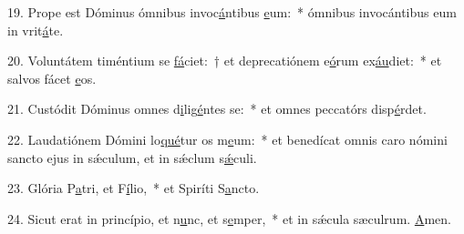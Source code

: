 19. Prope est Dóminus ómnibus invoc\uline{á}ntibus \uline{e}um:~* ómnibus invocántibus eum in vrit\uline{á}te.\par 
20. Voluntátem timéntium se \uline{fá}ciet:~† et deprecatiónem e\uline{ó}rum ex\uline{áu}diet:~* et salvos fácet \uline{e}os.\par 
21. Custódit Dóminus omnes d\uline{i}lig\uline{é}ntes se:~* et omnes peccatórs disp\uline{é}rdet.\par 
22. Laudatiónem Dómini lo\uline{qué}tur os m\uline{e}um:~* et benedícat omnis caro nómini sancto ejus in sǽculum, et in sǽclum s\uline{ǽ}culi.\par 
23. Glória P\uline{a}tri, et F\uline{í}lio,~* et Spiríti S\uline{a}ncto.\par 
24. Sicut erat in princípio, et n\uline{u}nc, et s\uline{e}mper,~* et in sǽcula sæculrum. \uline{A}men.\par 
